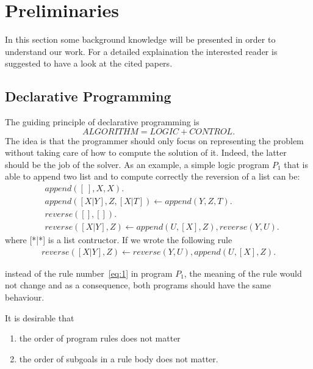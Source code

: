 \section{Preliminaries}
\label{sec:prelim}

In this section some background knowledge will be presented in order to understand our work. For a detailed explaination the interested reader is suggested to have a look at the cited papers. 

\subsection{Declarative Programming}
The guiding principle of declarative programming is 
\[ALGORITHM = LOGIC + CONTROL.\]
The idea is that the programmer should only focus on representing the problem without taking care of how to compute the solution of it. Indeed, the latter should be the job of the solver. As an example, a simple logic program \(P_1\) that  is able to append two list and to compute correctly the reversion of a list can be: 
\begin{align}
&append ([\:], X, X). \\
&append ([X|Y], Z, [X|T ]) \leftarrow append (Y, Z, T ). \\
&reverse([ ], [ ]).\\
&reverse([X|Y ], Z) \leftarrow append (U, [X], Z), reverse(Y, U ). \label{eq:1}
\end{align}
where [*|*] is a list contructor.
If we wrote the following rule 
\begin{align}
reverse([X|Y ], Z) \leftarrow reverse(Y, U ), append(U, [X], Z). \label{eq:2}
\end{align}

instead of the rule number~\ref{eq:1} in program \(P_1\), the meaning of the rule would not change and as a consequence, both programs should have the same behaviour. 

It is desirable that
\begin{enumerate}
\item the order of program rules does not matter
\item the order of subgoals in a rule body does not matter.
\end{enumerate}

